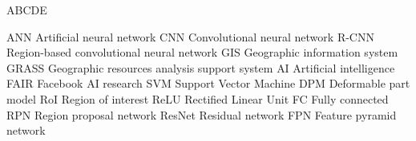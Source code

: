 
\begin{seznamzkratek}{ABCDE}

	      {ANN}
	      {Artificial neural network}
	      {CNN}
	      {Convolutional neural network}
	      {R-CNN}
	      {Region-based convolutional neural network}
	      {GIS}
	      {Geographic information system}
	      {GRASS}
	      {Geographic resources analysis support system}
	      {AI}
	      {Artificial intelligence}
	      {FAIR}
	      {Facebook AI research}
	      {SVM}
	      {Support Vector Machine}
	      {DPM}
	      {Deformable part model}
	      {RoI}
	      {Region of interest}
	      {ReLU}
	      {Rectified Linear Unit}
	      {FC}
	      {Fully connected}
	      {RPN}
	      {Region proposal network}
	      {ResNet}
	      {Residual network}
	      {FPN}
	      {Feature pyramid network}
	      
\end{seznamzkratek}